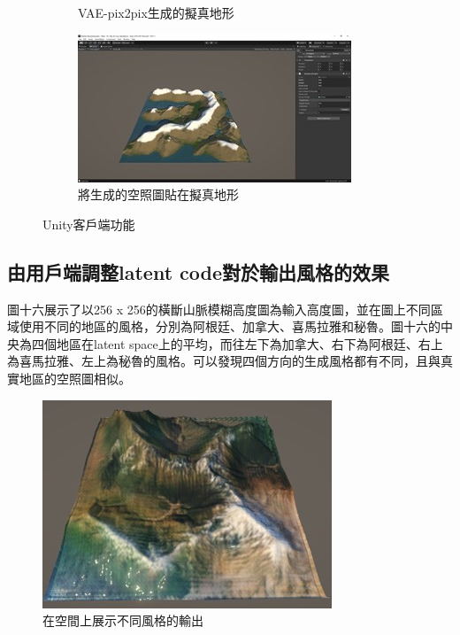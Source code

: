 \documentclass[a4paper, 12pt]{article}
\begin{document}
\begin{figure}
\begin{subfigure}[b]{0.475\textwidth}
        \caption[]%
        {{\small VAE-pix2pix生成的擬真地形}}
        \label{fig:16}
    \end{subfigure}
    \hfill
    \begin{subfigure}[b]{0.475\textwidth}
        \centering
        \includegraphics[width=\textwidth]{fig/15.jpg}
        \caption[]%
        {{\small 將生成的空照圖貼在擬真地形}}
        \label{fig:17}
    \end{subfigure}
    \caption[ The average and standard deviation of critical parameters ]
    {\small Unity客戶端功能}
    \label{fig:unity}
\end{figure}

\subsection{由用戶端調整latent code對於輸出風格的效果}
圖十六展示了以256 x 256的橫斷山脈模糊高度圖為輸入高度圖，並在圖上不同區域使用不同的地區的風格，分別為阿根廷、加拿大、喜馬拉雅和秘魯。圖十六的中央為四個地區在latent space上的平均，而往左下為加拿大、右下為阿根廷、右上為喜馬拉雅、左上為秘魯的風格。可以發現四個方向的生成風格都有不同，且與真實地區的空照圖相似。

\begin{figure}[htbp]
    \centering
    \includegraphics[width=0.7\linewidth]{fig/17.jpg}
    \caption{在空間上展示不同風格的輸出}
    \label{fig:17}
\end{figure}
\end{document}
